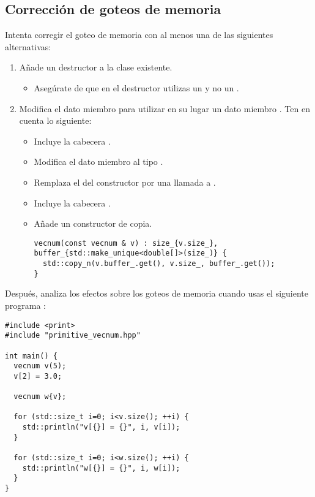 \subsection{Corrección de goteos de memoria}

Intenta corregir el goteo de memoria con al menos una de las siguientes alternativas:

\begin{enumerate}

\item Añade un destructor a la clase existente.
\begin{itemize}
  \item Asegúrate de que en el destructor utilizas 
        un   
        y no un  .
\end{itemize}

\item Modifica el dato miembro  
para utilizar en su lugar un dato miembro .
Ten en cuenta lo siguiente:

\begin{itemize}
  \item Incluye la cabecera .
  \item Modifica el dato miembro  al tipo .
  \item Remplaza el  del constructor por una llamada a .
  \item Incluye la cabecera .
  \item Añade un constructor de copia.
\begin{lstlisting}
vecnum(const vecnum & v) : size_{v.size_}, buffer_{std::make_unique<double[]>(size_)} {
  std::copy_n(v.buffer_.get(), v.size_, buffer_.get());
}
\end{lstlisting}
\end{itemize}

\end{enumerate}

Después, analiza los efectos sobre los goteos de memoria cuando usas el siguiente programa :

\begin{lstlisting}
#include <print>
#include "primitive_vecnum.hpp"

int main() {
  vecnum v(5);
  v[2] = 3.0;

  vecnum w{v};

  for (std::size_t i=0; i<v.size(); ++i) {
    std::println("v[{}] = {}", i, v[i]);
  }

  for (std::size_t i=0; i<w.size(); ++i) {
    std::println("w[{}] = {}", i, w[i]);
  }
}
\end{lstlisting}
